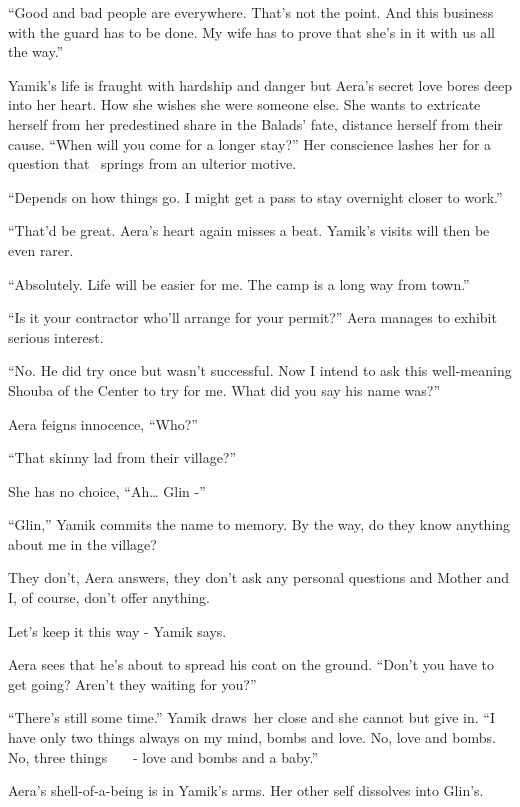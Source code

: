 \documentclass[letterpaper]{article}
\begin{document}
{}``Good and bad people are everywhere. That's not the point. And this business with the guard has to be done. My wife
has to prove that she's in it with us all the way.''

Yamik's life is fraught with hardship and danger but Aera's secret love bores deep into her heart. How she wishes she
were someone else. She wants to extricate herself from her predestined share in the Balads' fate, distance herself from
their cause. ``When will you come for a longer stay?'' Her conscience lashes her for a question that \ springs from an
ulterior motive. 

{}``Depends on how things go. I might get a pass to stay overnight closer to work.'' 

{}``That'd be great.{\textquotedbl} Aera's heart again misses a beat. Yamik's visits will then be even rarer. 

{}``Absolutely. Life will be easier for me. The camp is a long way from town.'' 

{}``Is it your contractor who'll arrange for your permit?'' Aera manages to exhibit serious interest. 

{}``No. He did try once but wasn't successful. Now I intend to ask this well-meaning Shouba of the Center to try for me.
What did you say his name was?'' 

Aera feigns innocence, ``Who?''~ 

{}``That skinny lad from their village?'' 

She has no choice, ``Ah{\dots} Glin -'' 

{}``Glin,'' Yamik commits the name to memory. {\textquotedbl}By the way, do they know anything about me in the
village?{\textquotedbl}

{\textquotedbl}They don't{\textquotedbl}, Aera answers, {\textquotedbl}they don't ask any personal questions and Mother
and I, of course, don't offer anything.{\textquotedbl}

{\textquotedbl}Let's keep it this way -{\textquotedbl} Yamik says.

Aera sees that he's about to spread his coat on the ground. ``Don't you have to get going? Aren't they waiting for
you?'' 

{}``There's still some time.'' Yamik draws~her close and she cannot but give in. ``I have only two things always on my
mind, bombs and love. No, love and bombs. No, three things \ \ \ {}- love and bombs and a baby.'' 

Aera's shell-of-a-being is in Yamik's arms.\textcolor{red}{ }Her other self dissolves into Glin's. 
\end{document}
